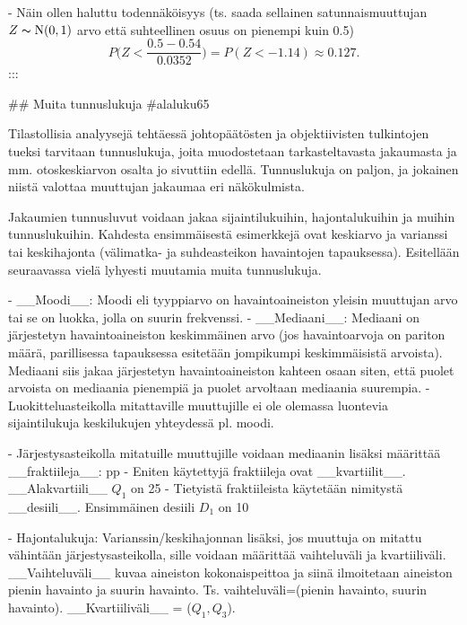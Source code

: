 \documentclass[
]{book}
\begin{document}
\begin{itemize}
- Näin ollen haluttu todennäköisyys (ts. saada sellainen satunnaismuuttujan $Z \thicksim \text{N}(0,1)$ arvo että suhteellinen osuus on pienempi kuin 0.5)
$$
P \Big(Z < \frac{0.5-0.54}{0.0352} \Big) = P (Z < -1.14) \approx 0.127.
$$
:::


## Muita tunnuslukuja {#alaluku65}

Tilastollisia analyysejä tehtäessä johtopäätösten ja objektiivisten tulkintojen tueksi tarvitaan tunnuslukuja, joita muodostetaan tarkasteltavasta jakaumasta ja mm. otoskeskiarvon osalta jo sivuttiin edellä. Tunnuslukuja on paljon, ja jokainen niistä valottaa muuttujan jakaumaa eri näkökulmista. 

Jakaumien tunnusluvut voidaan jakaa sijaintilukuihin, hajontalukuihin ja muihin tunnuslukuihin. Kahdesta ensimmäisestä esimerkkejä ovat keskiarvo ja varianssi tai keskihajonta (välimatka- ja suhdeasteikon havaintojen tapauksessa). Esitellään seuraavassa vielä lyhyesti muutamia muita tunnuslukuja.

- __Moodi__: Moodi eli tyyppiarvo on havaintoaineiston yleisin muuttujan arvo tai se on luokka, jolla on suurin frekvenssi.
- __Mediaani__: Mediaani on järjestetyn havaintoaineiston keskimmäinen arvo (jos havaintoarvoja on pariton määrä, parillisessa tapauksessa esitetään jompikumpi keskimmäisistä arvoista). Mediaani siis jakaa järjestetyn havaintoaineiston kahteen osaan siten, että puolet arvoista on mediaania pienempiä ja puolet arvoltaan mediaania suurempia.
  - Luokitteluasteikolla mitattaville muuttujille ei ole olemassa luontevia sijaintilukuja keskilukujen yhteydessä pl. moodi.

- Järjestysasteikolla mitatuille muuttujille voidaan mediaanin lisäksi määrittää __fraktiileja__: pp%
  - Eniten käytettyjä fraktiileja ovat __kvartiilit__. __Alakvartiili__ $Q_1$ on 25%
  - Tietyistä fraktiileista käytetään nimitystä __desiili__. Ensimmäinen desiili $D_1$ on 10%

- Hajontalukuja: Varianssin/keskihajonnan lisäksi, jos muuttuja on mitattu vähintään järjestysasteikolla, sille voidaan määrittää vaihteluväli ja kvartiiliväli. __Vaihteluväli__ kuvaa aineiston kokonaispeittoa ja siinä ilmoitetaan aineiston pienin havainto ja suurin havainto. Ts. vaihteluväli=(pienin havainto, suurin havainto). __Kvartiiliväli__ = ($Q_1, Q_3$).


\end{itemize}
\end{document}
